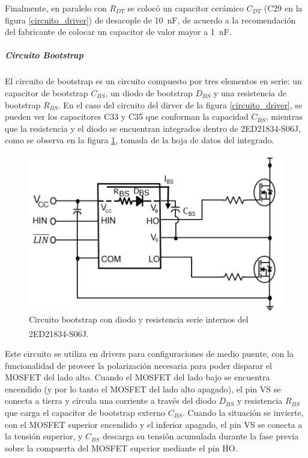 Finalmente, en paralelo con $R_{DT}$ se colocó un capacitor cerámico $C_{DT}$ (C29 en la figura \ref{circuito_driver}) de desacople de \SI[]{10}{\nano\farad}, de acuerdo a la recomendación del fabricante de colocar un capacitor de valor mayor a \SI[]{1}{\nano\farad}.\\

\subparagraph{Circuito Bootstrap}

El circuito de bootstrap es un circuito compuesto por tres elementos en serie: un capacitor de bootstrap $C_{BS}$, un diodo de bootstrap $D_{BS}$ y una resistencia de bootstrap $R_{BS}$. En el caso del circuito del dirver de la figura \ref{circuito_driver}, se pueden ver los capacitores C33 y C35 que conforman la capacidad $C_{BS}$, mientras que la resistencia y el diodo se encuentran integrados dentro de 2ED21834-S06J, como se observa en la figura \ref{circuito_bootstrap}, tomada de la hoja de datos del integrado.\\

\begin{figure}[h]
    \centering
    \includegraphics[scale=1]{Imagenes/Circuito Bootstrap.png}
    \caption{Circuito bootstrap con diodo y resistencia serie internos del 2ED21834-S06J.\textsuperscript{\cite{DatasheetDriver}}}
    \label{circuito_bootstrap}
\end{figure}

Este circuito se utiliza en drivers para configuraciones de medio puente, con la funcionalidad de proveer la polarización necesaria para poder disparar el MOSFET del lado alto. Cuando el MOSFET del lado bajo se encuentra encendido (y por lo tanto el MOSFET del lado alto apagado), el pin VS se conecta a tierra y circula una corriente a través del diodo $D_{BS}$ y resistencia $R_{BS}$ que carga el capacitor de bootstrap externo $C_{BS}$. Cuando la situación se invierte, con el MOSFET superior encendido y el inferior apagado, el pin VS se conecta a la tensión superior, y $C_{BS}$ descarga su tensión acumulada durante la fase previa sobre la compuerta del MOSFET superior mediante el pin HO.\\

